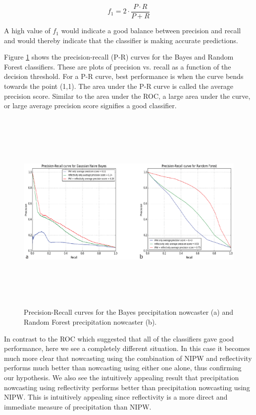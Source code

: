 \documentclass[proposal]{umassthesis}
\begin{document}
{\begin{equation}
f_1 = 2 \cdot \dfrac{P \cdot R}{P + R}
\end{equation}

A high value of $f_1$ would indicate a good balance between precision and recall and would thereby indicate that the classifier is making accurate predictions.

Figure \ref{fig:initial_results} shows the precision-recall (P-R) curves for the Bayes and Random Forest classifiers. These are plots of precision vs. recall as a function of the decision threshold. For a P-R curve, best performance is when the curve bends towards the point (1,1). The area under the P-R curve is called the average precision score. Similar to the area under the ROC, a large area under the curve, or large average precision score signifies a good classifier.

\begin{figure}[!t]
\begin{center}
\includegraphics[width = 15cm,height = 10cm]{initial_results}
\caption{Precision-Recall curves for the Bayes precipitation nowcaster (a) and Random Forest precipitation nowcaster (b).}
\label{fig:initial_results}
\end{center}
\end{figure}

In contrast to the ROC which suggested that all of the classifiers gave good performance, here we see a completely different situation. In this case it becomes much more clear that nowcasting using the combination of NIPW and reflectivity performs much better than nowcasting using either one alone, thus confirming our hypothesis. We also see the intuitively appealing result that precipitation nowcasting using reflectivity performs better than precipitation nowcasting using NIPW. This is intuitively appealing since reflectivity is a more direct and immediate measure of precipitation than NIPW.   

}
\end{document}
